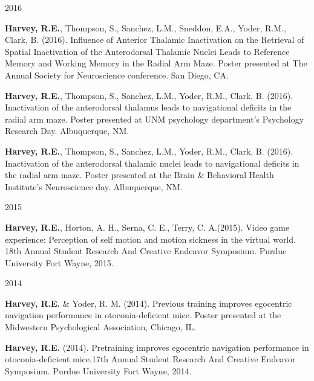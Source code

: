 \begin{cventries}
\cventry
    {} %
    {} %
    {} %
    {2016} %
    {
      \begin{cvitems} %
      \setlength\itemsep{0.35em}
        \item {\textbf{Harvey, R.E.}, Thompson, S., Sanchez, L.M., Sneddon, E.A., Yoder, R.M., Clark, B. (2016). Influence of Anterior Thalamic Inactivation on the Retrieval of Spatial Inactivation of the Anterodorsal Thalamic Nuclei Leads to Reference Memory and Working Memory in the Radial Arm Maze. Poster presented at The Annual Society for Neuroscience conference. San Diego, CA.}
        \item {\textbf{Harvey, R.E.}, Thompson, S., Sanchez, L.M., Yoder, R.M., Clark, B. (2016). Inactivation of the anterodorsal thalamus leads to navigational deficits in the radial arm maze. Poster presented at UNM psychology department’s Psychology Research Day. Albuquerque, NM.}
        \item {\textbf{Harvey, R.E.}, Thompson, S., Sanchez, L.M., Yoder, R.M., Clark, B. (2016). Inactivation of the anterodorsal thalamic nuclei leads to navigational deficits in the radial arm maze. Poster presented at the Brain \& Behavioral Health Institute’s Neuroscience day. Albuquerque, NM.}
      \end{cvitems}
    }
\end{cventries}


\begin{cventries}
\cventry
    {} %
    {} %
    {} %
    {2015} %
    {
      \begin{cvitems} %
      \setlength\itemsep{0.35em}
        \item {\textbf{Harvey, R.E.}, Horton, A. H., Serna, C. E., Terry, C. A.(2015). Video game experience: Perception of self motion and motion sickness in the virtual world. 18th Annual Student Research And Creative Endeavor Symposium. Purdue University Fort Wayne, 2015.}
      \end{cvitems}
    }
\end{cventries}


\begin{cventries}
\cventry
    {} %
    {} %
    {} %
    {2014} %
    {
      \begin{cvitems} %
      \setlength\itemsep{0.35em}
        \item {\textbf{Harvey, R.E.} \& Yoder, R. M. (2014). Previous training improves egocentric navigation performance in otoconia-deficient mice. Poster presented at the Midwestern Psychological Association, Chicago, IL.}
        \item {\textbf{Harvey, R.E.} (2014). Pretraining improves egocentric navigation performance in otoconia-deficient mice.17th Annual Student Research And Creative Endeavor Symposium. Purdue University Fort Wayne, 2014.}
      \end{cvitems}
    }
\end{cventries}


